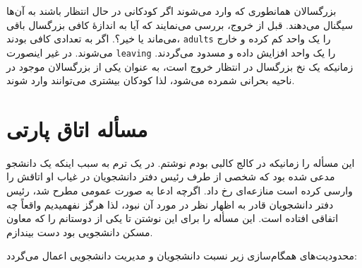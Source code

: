 \documentclass{book}
\begin{document}
    بزرگسالان همانطوری که وارد می‌شوند اگر کودکانی در حال انتظار باشند به آن‌ها سیگنال می‌دهند. قبل از خروج، بررسی می‌نمایند که آیا به اندازهٔ کافی بزرگسال 
    باقی می‌ماند یا خیر؟. اگر به تعدادی کافی بودند، {\tt adults} را یک واحد کم کرده و خارج می‌شوند. در غیر اینصورت {\tt leaving} را یک واحد افزایش 
    داده و مسدود می‌گردند. زمانیکه یک نخ بزرگسال در انتظار خروج است، به عنوان یکی از بزرگسالان موجود در ناحیه بحرانی شمرده می‌شود، لذا کودکان 
    بیشتری می‌توانند وارد شوند.     


\newpage
\section{مسأله اتاق پارتی}

    این مسأله را زمانیکه در کالج کالبی بودم نوشتم. در یک ترم  به سبب اینکه یک دانشجو مدعی شده بود که شخصی از طرف رئیس دفتر دانشجویان 
    در غیاب او اتاقش را وارسی کرده است منازعه‌ای رخ داد. اگرچه ادعا به صورت عمومی مطرح شد، رئیس دفتر دانشجویان قادر به اظهار نظر در مورد آن نبود، 
    لذا هرگز نفهمیدیم واقعاً چه اتفاقی افتاده است. این مسأله را برای این نوشتن تا یکی از دوستانم را که معاون مسکن دانشجویی بود دست بیندازم. 

    محدودیت‌های همگام‌سازی زیر نسبت دانشجویان و مدیریت دانشجویی اعمال می‌گردد: 
\end{document}

